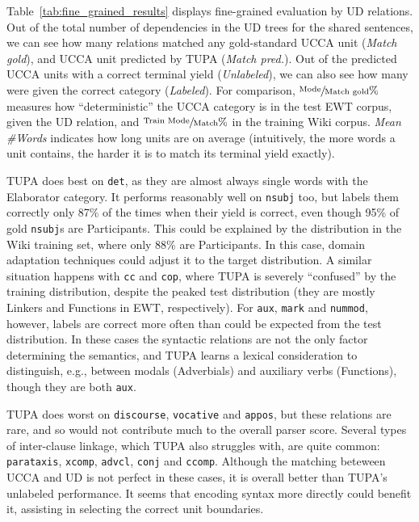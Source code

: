 \documentclass[11pt,a4paper]{article}
\begin{document}
Table~\ref{tab:fine_grained_results} displays
fine-grained evaluation by UD relations.
Out of the total number of dependencies in the UD trees for the shared sentences,
we can see how many relations matched any gold-standard UCCA unit (\textit{Match gold}), and
UCCA unit predicted by TUPA (\textit{Match pred.}).
Out of the predicted UCCA units with a correct terminal yield (\textit{Unlabeled}),
we can also see how many were given the correct category (\textit{Labeled}).
For comparison, $\sfrac{\text{Mode}}{\text{Match gold}}\%$ measures how ``deterministic''
the UCCA category is in the test EWT corpus, given the UD relation,
and $\sfrac{\text{Train Mode}}{\text{Match}}\%$ in the training Wiki corpus.
\textit{Mean {\#}Words} indicates how long units are on average
(intuitively, the more words a unit contains, the harder it is to match its terminal yield exactly).

TUPA does best on \texttt{det},
as they are almost always single words with the Elaborator category.
It performs reasonably well on \texttt{nsubj} too,
but labels them correctly only 87\% of the times when their yield is correct,
even though 95\% of gold \texttt{nsubj}s are Participants.
This could be explained by the distribution in the Wiki training set,
where only 88\% are Participants.
In this case, domain adaptation techniques could adjust it to the target distribution.
A similar situation happens with \texttt{cc} and \texttt{cop},
where TUPA is severely ``confused'' by the training distribution,
despite the peaked test distribution (they are mostly Linkers and Functions in EWT,
respectively).
For \texttt{aux}, \texttt{mark} and \texttt{nummod}, however,
labels are correct more often than could be expected from the test distribution.
In these cases the syntactic relations are not the only factor determining
the semantics, and TUPA learns a lexical consideration to distinguish,
e.g., between modals (Adverbials) and auxiliary verbs (Functions),
though they are both \texttt{aux}.

TUPA does worst on \texttt{discourse}, \texttt{vocative} and \texttt{appos},
but these relations are rare,
and so would not contribute much to the overall parser score.
Several types of inter-clause linkage, which TUPA also struggles with,
are quite common: \texttt{parataxis}, \texttt{xcomp}, \texttt{advcl},
\texttt{conj} and \texttt{ccomp}.
Although the matching beteween UCCA and UD is not perfect in these cases,
it is overall better than TUPA's unlabeled performance.
It seems that encoding syntax more directly could benefit it,
assisting in selecting the correct unit boundaries.
\end{document}
